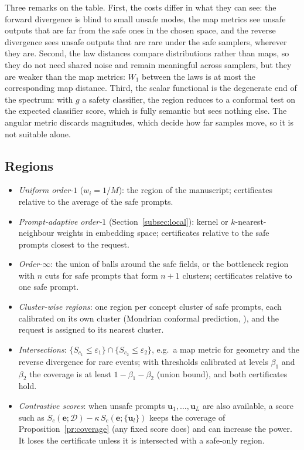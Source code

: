 \documentclass{article}
\newcommand{\cD}{\mathcal{D}}                       %
\newcommand{\be}{\mathbf{e}}                       %
\theoremstyle{plain}
\begin{document}
Three remarks on the table. First, the costs differ in what they can see: the forward divergence is
blind to small unsafe modes, the map metrics see unsafe outputs that are far from the safe ones in the
chosen space, and the reverse divergence sees unsafe outputs that are rare under the safe samplers,
wherever they are. Second, the law distances compare distributions rather than maps, so they do not
need shared noise and remain meaningful across samplers, but they are weaker than the map metrics:
$W_1$ between the laws is at most the corresponding map distance. Third, the scalar functional is the
degenerate end of the spectrum: with $g$ a safety classifier, the region reduces to a conformal test on
the expected classifier score, which is fully semantic but sees nothing else. The angular metric
discards magnitudes, which decide how far samples move, so it is not suitable alone.

\subsection{Regions}\label{subsec:regions}
\begin{itemize}
\item \emph{Uniform order-$1$} ($w_i=1/M$): the region of the manuscript; certificates relative to the
average of the safe prompts.
\item \emph{Prompt-adaptive order-$1$} (Section~\ref{subsec:local}): kernel or $k$-nearest-neighbour
weights in embedding space; certificates relative to the safe prompts closest to the request.
\item \emph{Order-$\infty$}: the union of balls around the safe fields, or the bottleneck region with
$n$ cuts for safe prompts that form $n+1$ clusters; certificates relative to one safe prompt.
\item \emph{Cluster-wise regions}: one region per concept cluster of safe prompts, each calibrated on its
own cluster (Mondrian conformal prediction, \citealt{vovk2005algorithmic}), and the request is assigned to
its nearest cluster.
\item \emph{Intersections}: $\{S_{c_1}\leq\varepsilon_1\}\cap\{S_{c_2}\leq\varepsilon_2\}$, e.g.\ a map metric for geometry and the
reverse divergence for rare events; with thresholds calibrated at levels $\beta_1$ and $\beta_2$ the coverage is
at least $1-\beta_1-\beta_2$ (union bound), and both certificates hold.
\item \emph{Contrastive scores}: when unsafe prompts $\mathbf{u}_1,\dots,\mathbf{u}_L$ are also available, a score
such as $S_c(\be;\cD)-\kappa\,S_c(\be;\{\mathbf{u}_l\})$ keeps the coverage of Proposition~\ref{pr:coverage} (any fixed
score does) and can increase the power. It loses the certificate unless it is intersected with a
safe-only region.
\end{itemize}
\end{document}
